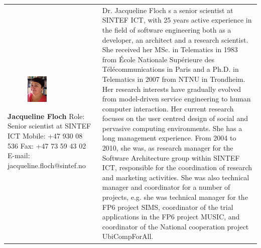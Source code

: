 \documentclass[11pt]{book}
\begin{document}
\begin{table}[H]
\centering
\begin{tabular}{ p{7cm} p{7cm} }
\parbox{7cm}{
\begin{figure}[H]
      \includegraphics[width=0.4\textwidth]{Figures/jacquelineFloch.jpg}
      \label{fig:partners_customer_jacqueline}
\end{figure}
\textbf{Jacqueline Floch}\\
Role: Senior scientist at SINTEF ICT\\
Mobile: +47 930 08 536\\
Fax: +47 73 59 43 02\\
E-mail: jacqueline.floch@sintef.no} & \parbox{7cm}{
Dr. Jacqueline Floch s a senior scientist at SINTEF ICT, with 25 years active experience in the field of software engineering both as a developer, an architect and a research scientist. She received her MSc. in Telematics in 1983 from École Nationale Supérieure des Télécommunications in Paris and a Ph.D. in Telematics in 2007 from NTNU in Trondheim. Her research interests have gradually evolved from model-driven service engineering to human computer interaction. Her current research focuses on the user centred design of social and pervasive computing environments. She has a long management experience. From 2004 to 2010, she was, as research manager for the Software Architecture group within SINTEF ICT, responsible for the coordination of research and marketing activities. She was also technical manager and coordinator for a number of projects, e.g. she was technical manager for the FP6 project SIMS, coordinator of the trial applications in the FP6 project MUSIC, and coordinator of the National cooperation project UbiCompForAll.
}
\end{tabular}
\label{tab:partners_customer_jacqueline}
\end{table}
\end{document}
